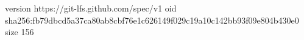 version https://git-lfs.github.com/spec/v1
oid sha256:fb79dbcd5a37ca80ab8cbf76e1c626149f029c19a10c142bb93f09e804b430e0
size 156

